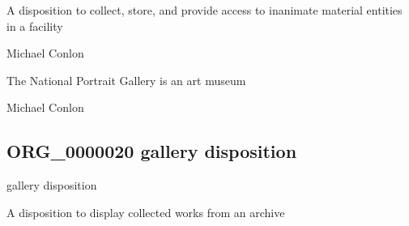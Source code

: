 \documentclass[letterpaper,10pt,english]{sphinxmanual}
\begin{document}
\begin{sphinxShadowBox}

\sphinxAtStartPar
A disposition to collect, store, and provide access to inanimate material entities in a facility
\end{sphinxShadowBox}

\begin{sphinxShadowBox}

\sphinxAtStartPar
Michael Conlon 
\end{sphinxShadowBox}

\begin{sphinxShadowBox}

\sphinxAtStartPar
The National Portrait Gallery is an art museum
\end{sphinxShadowBox}

\begin{sphinxShadowBox}

\sphinxAtStartPar
Michael Conlon 
\end{sphinxShadowBox}
\begin{quote}

\ignorespaces \end{quote}


\subsection{ORG\_0000020 \sphinxhyphen{} gallery disposition}
\label{\detokenize{doc-ORG_0000020:org-0000020-gallery-disposition}}\label{\detokenize{doc-ORG_0000020:index-0}}\label{\detokenize{doc-ORG_0000020::doc}}
\begin{sphinxShadowBox}

\sphinxAtStartPar
gallery disposition
\end{sphinxShadowBox}

\begin{sphinxShadowBox}

\sphinxAtStartPar
A disposition to display collected works from an archive
\end{sphinxShadowBox}
\end{document}
